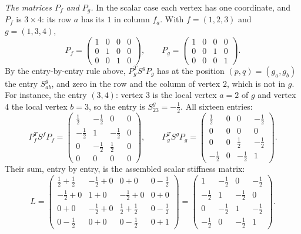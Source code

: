 \begin{example}
\emph{The matrices $P_f$ and $P_g$.} In the scalar case each vertex has one coordinate, and $P_f$ is $3\times 4$: its row $a$ has its $1$ in column $f_a$. With $f = (1, 2, 3)$ and $g = (1, 3, 4)$,
\begin{equation*}
P_f = \begin{pmatrix} 1 & 0 & 0 & 0 \\ 0 & 1 & 0 & 0 \\ 0 & 0 & 1 & 0\end{pmatrix}, \qquad P_g = \begin{pmatrix} 1 & 0 & 0 & 0 \\ 0 & 0 & 1 & 0 \\ 0 & 0 & 0 & 1\end{pmatrix} .
\end{equation*}
By the entry-by-entry rule above, $P_g^T S^g P_g$ has at the position $(p, q) = (g_a, g_b)$ the entry $S^g_{ab}$, and zero in the row and the column of vertex $2$, which is not in $g$. For instance, the entry $(3, 4)$: vertex $3$ is the local vertex $a = 2$ of $g$ and vertex $4$ the local vertex $b = 3$, so the entry is $S^g_{23} = -\frac12$. All sixteen entries:
\begin{equation*}
P_f^T S^f P_f = \begin{pmatrix} \frac12 & -\frac12 & 0 & 0 \\ -\frac12 & 1 & -\frac12 & 0 \\ 0 & -\frac12 & \frac12 & 0 \\ 0 & 0 & 0 & 0\end{pmatrix}, \qquad
P_g^T S^g P_g = \begin{pmatrix} \frac12 & 0 & 0 & -\frac12 \\ 0 & 0 & 0 & 0 \\ 0 & 0 & \frac12 & -\frac12 \\ -\frac12 & 0 & -\frac12 & 1\end{pmatrix} .
\end{equation*}
Their sum, entry by entry, is the assembled scalar stiffness matrix:
\begin{equation*}
L = \begin{pmatrix} \frac12 + \frac12 & -\frac12 + 0 & 0 + 0 & 0 - \frac12 \\ -\frac12 + 0 & 1 + 0 & -\frac12 + 0 & 0 + 0 \\ 0 + 0 & -\frac12 + 0 & \frac12 + \frac12 & 0 - \frac12 \\ 0 - \frac12 & 0 + 0 & 0 - \frac12 & 0 + 1\end{pmatrix}
= \begin{pmatrix} 1 & -\frac12 & 0 & -\frac12 \\ -\frac12 & 1 & -\frac12 & 0 \\ 0 & -\frac12 & 1 & -\frac12 \\ -\frac12 & 0 & -\frac12 & 1\end{pmatrix} .

\end{equation*}
\end{example}
